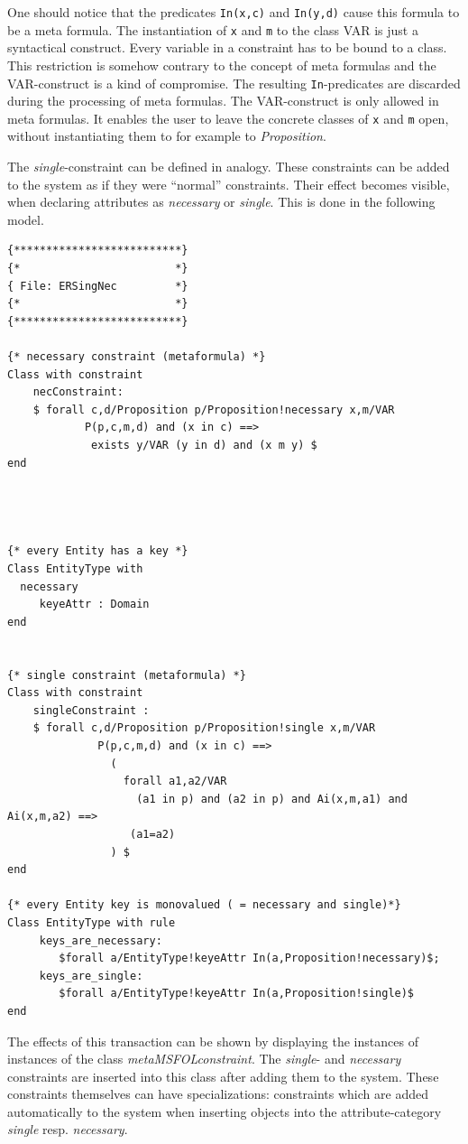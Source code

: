 One should notice that the predicates {\tt In(x,c)} and {\tt In(y,d)} cause
this formula to be a meta formula. The instantiation of {\tt x} and {\tt m}
to the class VAR is just a syntactical construct. Every variable in a
constraint has to be bound to a class. This restriction is somehow contrary
to the concept of meta formulas and the VAR-construct is a kind of compromise.
The resulting {\tt In}-predicates are discarded during the processing of
meta formulas. The VAR-construct is only allowed in meta formulas. It enables
the user to leave the concrete classes of {\tt x} and {\tt m} open, without
instantiating them to for example to {\em Proposition}.

The {\em single}-constraint can be defined in analogy.
%
These constraints can be added to the system as if they were ``normal''
constraints. Their effect becomes visible, when declaring attributes
as {\em necessary} or {\em single}. This is done in the following model.

{\small
\begin{verbatim}
{**************************}
{*                        *}
{ File: ERSingNec         *}
{*                        *}
{**************************}

{* necessary constraint (metaformula) *}
Class with constraint
    necConstraint:
    $ forall c,d/Proposition p/Proposition!necessary x,m/VAR
            P(p,c,m,d) and (x in c) ==>
             exists y/VAR (y in d) and (x m y) $
end




{* every Entity has a key *}
Class EntityType with
  necessary
     keyeAttr : Domain
end


{* single constraint (metaformula) *}
Class with constraint
    singleConstraint :
    $ forall c,d/Proposition p/Proposition!single x,m/VAR
              P(p,c,m,d) and (x in c) ==>
                (
                  forall a1,a2/VAR
                    (a1 in p) and (a2 in p) and Ai(x,m,a1) and Ai(x,m,a2) ==>
                   (a1=a2)
                ) $
end

{* every Entity key is monovalued ( = necessary and single)*}
Class EntityType with rule
     keys_are_necessary:
        $forall a/EntityType!keyeAttr In(a,Proposition!necessary)$;
     keys_are_single:
        $forall a/EntityType!keyeAttr In(a,Proposition!single)$
end
\end{verbatim}
}


The effects of this transaction can be shown by displaying
the instances of instances of the class {\em metaMSFOLconstraint}.
The {\em single}- and {\em necessary} constraints are inserted into this
class after adding them to the system. These constraints themselves can have
specializations: constraints which are added automatically to the system
when inserting objects into the attribute-category {\em single} resp.
{\em necessary}.

